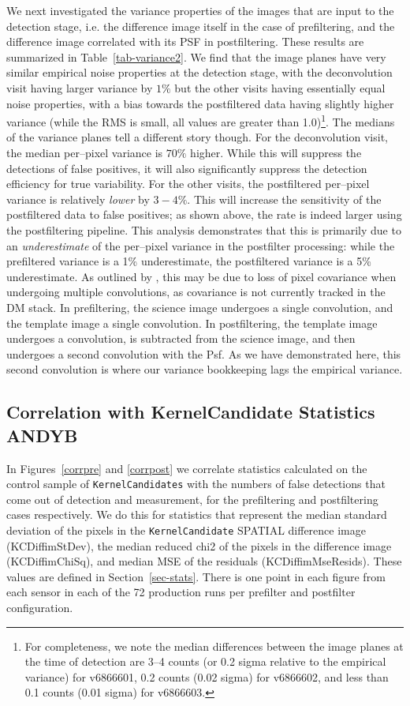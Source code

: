 \documentclass[prd, nofootinbib, floatfix, 11pt,tightenlines,times]{article}
\begin{document}
We next investigated the variance properties of the images that are
input to the detection stage, i.e. the difference image itself in the
case of prefiltering, and the difference image correlated with its PSF
in postfiltering.  These results are summarized in
Table~\ref{tab-variance2}.  We find that the image planes have very
similar empirical noise properties at the detection stage, with the
deconvolution visit having larger variance by $1\%$ but the other
visits having essentially equal noise properties, with a bias towards
the postfiltered data having slightly higher variance (while the RMS
is small, all values are greater than 1.0)\footnote{For completeness,
  we note the median differences between the image planes at the time
  of detection are 3--4 counts (or 0.2 sigma relative to the empirical
  variance) for v6866601, 0.2 counts (0.02 sigma) for v6866602, and
  less than 0.1 counts (0.01 sigma) for v6866603.}.  The medians of
the variance planes tell a different story though.  For the
deconvolution visit, the median per--pixel variance is $70\%$ higher.
While this will suppress the detections of false positives, it will
also significantly suppress the detection efficiency for true
variability.  For the other visits, the postfiltered per--pixel
variance is relatively {\it lower} by $3-4\%$.  This will increase
the sensitivity of the postfiltered data to false positives; as shown
above, the rate is indeed larger using the postfiltering pipeline.
This analysis demonstrates that this is primarily due to an {\it
  underestimate} of the per--pixel variance in the postfilter
processing: while the prefiltered variance is a 1\% underestimate, the
postfiltered variance is a 5\% underestimate.  As outlined by
\cite{Price-Stacking}, this may be due to loss of pixel covariance
when undergoing multiple convolutions, as covariance is not currently
tracked in the DM stack.  In prefiltering, the science image undergoes
a single convolution, and the template image a single convolution.  In
postfiltering, the template image undergoes a convolution, is
subtracted from the science image, and then undergoes a second
convolution with the Psf.  As we have demonstrated here, this second
convolution is where our variance bookkeeping lags the empirical
variance.


\subsection{Correlation with KernelCandidate Statistics {\bf ANDYB}}

In Figures~\ref{corrpre} and \ref{corrpost} we correlate statistics
calculated on the control sample of {\tt KernelCandidates} with the
numbers of false detections that come out of detection and
measurement, for the prefiltering and postfiltering cases
respectively.  We do this for statistics that represent the median
standard deviation of the pixels in the {\tt KernelCandidate} SPATIAL
difference image (KCDiffimStDev), the median reduced chi2 of the
pixels in the difference image (KCDiffimChiSq), and median MSE of the
residuals (KCDiffimMseResids).  These values are defined in
Section~\ref{sec-stats}.  There is one point in each figure from each
sensor in each of the 72 production runs per prefilter and postfilter
configuration.
\end{document}
